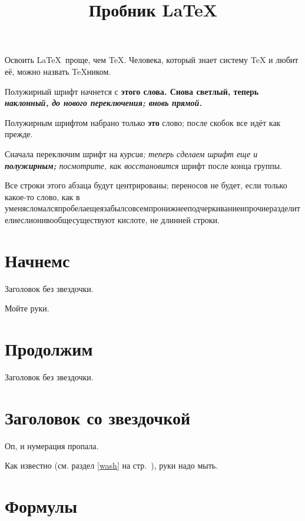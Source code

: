 \documentclass{article}
\title{Пробник \LaTeX}
\begin{document}
\maketitle

Освоить \LaTeX\ проще, чем \TeX. Человека, который знает систему \TeX{} и любит её, можно назвать \TeX ником. 

Полужирный шрифт начнется с \bfseries этого слова.
Снова \mdseries светлый, теперь \slshape наклонный, до нового переключения; вновь \upshape прямой.

Полужирным шрифтом набрано только {\bfseries это} слово; после скобок все идёт как прежде.

Сначала {переключим шрифт на \itshape курсив; теперь сделаем шрифт еще и {\bfseries полужирным;} посмотрите, как восстановится} шрифт после кон{ца г}руппы.

\begin{center}
	Все строки этого абзаца будут центрированы; переносов не будет, если только какое-то слово, как в уменясломалсяпробелаещеязабылсовсемпронижнееподчеркиваниеипрочиеразделителиеслионивообщесуществуют кислоте, не длинней строки.
\end{center}

\section{Начнемс}
Заголовок без звездочки.

Мойте руки.\label{wash}

\section{Продолжим}
Заголовок без звездочки.

\section*{Заголовок со звездочкой}

Оп, и нумерация пропала.

Как известно (см. раздел \ref{wash} на стр.~\pageref{wash}), руки надо мыть.

\section{Формулы}
\end{document}
